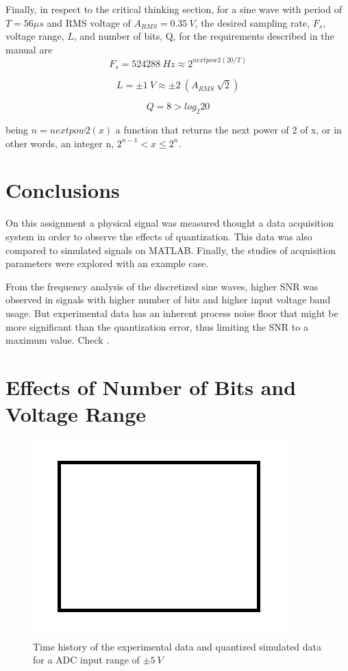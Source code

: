 \documentclass[10pt,letterpaper,twocolumn]{article}
\begin{document}
    Finally, in respect to the critical thinking section, for a sine wave with period of $T = 56 \mu s$ and RMS voltage of $A_{RMS} = 0.35\ V$, the desired sampling rate, $F_s$, voltage range, $L$, and number of bits, Q, for the requirements described in the manual are
    \begin{equation}
    F_s = 524288\ Hz \approx 2^{nextpow2(20/T)}
    \end{equation}
    
    \begin{equation}
    L = \pm 1\ V \approx \pm 2\ (A_{RMS}\ \sqrt 2)
    \end{equation}
    
    \begin{equation}
    Q = 8 > log_2 20
    \end{equation}
    
    being $n = nextpow2(x)$ a function that returns the next power of 2 of x, or in other words, an integer n, $2^{n-1} < x \leq 2^n$.
    
\section{Conclusions}
    On this assignment a physical signal was measured thought a data acquisition system in order to observe the effects of quantization. This data was also compared to simulated signals on MATLAB. Finally, the studies of acquisition parameters were explored with an example case.
    
    From the frequency analysis of the discretized sine waves, higher SNR was observed in signals with higher number of bits and higher input voltage band usage. But experimental data has an inherent process noise floor that might be more significant than the quantization error, thus limiting the SNR to a maximum value. Check \cite{einstein}.

\printbibliography

\onecolumn
\clearpage
\appendix
\appendixpage

\section{Effects of Number of Bits and Voltage Range}
    \begin{figure}[h]
    	\centering
        \includegraphics[width=0.6\linewidth]{img/sample}
        \captionsetup{width=0.6\textwidth}
        \caption{Time history of the experimental data and quantized simulated data for a ADC input range of $\pm 5\ V$}
        \label{fig:range5}
    \end{figure}
    
\end{document}
